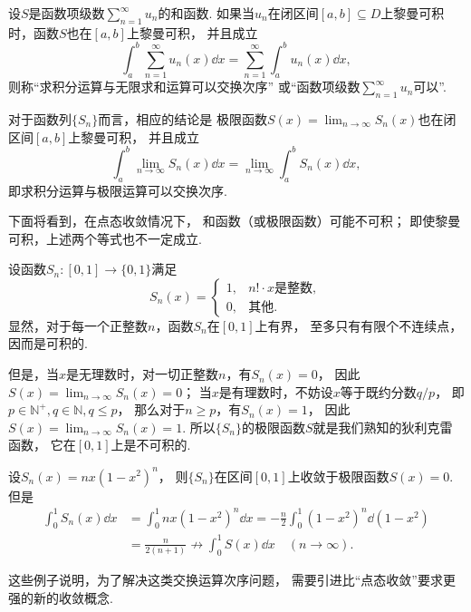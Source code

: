 \begin{definition}
设\(S\)是函数项级数\(\sum_{n=1}^\infty u_n\)的和函数.
如果当\(u_n\)在闭区间\([a,b] \subseteq D\)上黎曼可积时，函数\(S\)也在\([a,b]\)上黎曼可积，
并且成立\[
	\int_a^b \sum_{n=1}^\infty u_n(x) \dd{x}
	= \sum_{n=1}^\infty \int_a^b u_n(x) \dd{x},
\]
则称“求积分运算与无限求和运算可以交换次序”
或“函数项级数\(\sum_{n=1}^\infty u_n\)可以”.
\end{definition}
对于函数列\(\{S_n\}\)而言，相应的结论是
极限函数\(S(x) = \lim_{n\to\infty} S_n(x)\)也在闭区间\([a,b]\)上黎曼可积，
并且成立\[
	\int_a^b \lim_{n\to\infty} S_n(x) \dd{x}
	= \lim_{n\to\infty} \int_a^b S_n(x) \dd{x},
\]
即求积分运算与极限运算可以交换次序.

下面将看到，在点态收敛情况下，
和函数（或极限函数）可能不可积；
即使黎曼可积，上述两个等式也不一定成立.
\begin{example}
设函数\(S_n\colon[0,1]\to\{0,1\}\)满足\[
	S_n(x) = \left\{ \begin{array}{cl}
		1, & \text{$n! \cdot x$是整数},  \\
		0, & \text{其他}.
	\end{array} \right.
\]
显然，对于每一个正整数\(n\)，函数\(S_n\)在\([0,1]\)上有界，
至多只有有限个不连续点，因而是可积的.

但是，当\(x\)是无理数时，对一切正整数\(n\)，有\(S_n(x) = 0\)，
因此\(S(x) = \lim_{n\to\infty} S_n(x) = 0\)；
当\(x\)是有理数时，不妨设\(x\)等于既约分数\(q/p\)，
即\(p\in\mathbb{N}^+,
q\in\mathbb{N},
q \leq p\)，
那么对于\(n \geq p\)，有\(S_n(x) = 1\)，
因此\(S(x) = \lim_{n\to\infty} S_n(x) = 1\).
所以\(\{S_n\}\)的极限函数\(S\)就是我们熟知的狄利克雷函数，
它在\([0,1]\)上是不可积的.
\end{example}
\begin{example}
设\(S_n(x) = nx(1-x^2)^n\)，
则\(\{S_n\}\)在区间\([0,1]\)上收敛于极限函数\(S(x) = 0\).
但是\begin{align*}
	\int_0^1 S_n(x) \dd{x}
	&= \int_0^1 n x (1-x^2)^n \dd{x}
	= -\frac{n}{2} \int_0^1 (1-x^2)^n \dd(1-x^2) \\
	&= \frac{n}{2(n+1)}
	\not\to \int_0^1 S(x) \dd{x}
	\quad(n\to\infty).
\end{align*}
\end{example}
这些例子说明，为了解决这类交换运算次序问题，
需要引进比“点态收敛”要求更强的新的收敛概念.

